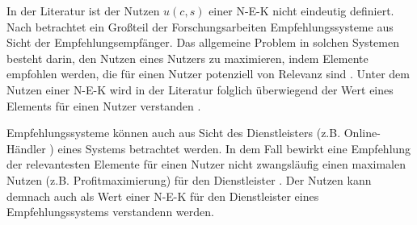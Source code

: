 In der Literatur ist der Nutzen $u(c,s)$ einer \ac{N-E-K} nicht eindeutig definiert.
Nach \textcite[S. 1]{jannach:article} betrachtet ein Großteil der Forschungsarbeiten Empfehlungssysteme aus Sicht der Empfehlungsempfänger.
Das allgemeine Problem in solchen Systemen besteht darin, den Nutzen eines Nutzers zu maximieren, indem Elemente empfohlen werden, die für einen Nutzer potenziell von Relevanz sind \cite[S. 1]{jannach:article}.
Unter dem Nutzen einer \ac{N-E-K} wird in der Literatur folglich überwiegend der Wert eines Elements für einen Nutzer verstanden \cite[S. 10f.]{ricci:inbook}\cite[S. 1]{klahold:book}\cite[S. 735]{adomavicius:inproceedings}.

Empfehlungssysteme können auch aus Sicht des Dienstleisters (z.B. Online-Händler \cite[S. 1]{jannach:article}\cite[S. 1]{das:article}) eines Systems betrachtet werden.
In dem Fall bewirkt eine Empfehlung der relevantesten Elemente für einen Nutzer nicht zwangsläufig einen maximalen Nutzen (z.B. Profitmaximierung) für den Dienstleister \cite[S. 1]{jannach:article}.
Der Nutzen kann demnach auch als Wert einer \ac{N-E-K} für den Dienstleister eines Empfehlungssystems verstandenn werden.

